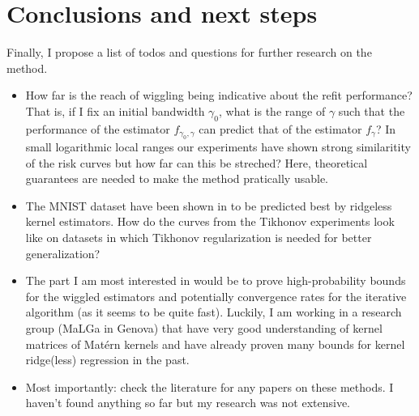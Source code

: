 \documentclass[12pt]{amsart}
\begin{document}
%

\section{Conclusions and next steps}

Finally, I propose a list of todos and questions for further research on 
the method.
\begin{itemize}
    \item How far is the reach of wiggling being indicative about the refit
        performance? That is, if I fix an initial bandwidth $\gamma_0$, 
        what is the range of $\gamma$ such that the performance of the 
        estimator $f_{\gamma_0, \gamma}$ can predict that of the estimator
        $f_\gamma$? In small logarithmic local ranges our experiments have
        shown strong similaritity of the risk curves but how far can this be 
        streched? Here, theoretical guarantees are needed to make the method
        pratically usable.
    \item The MNIST dataset have been shown in \cite{justinterpolate} to 
        be predicted best by ridgeless kernel estimators.
        How do the curves from the Tikhonov experiments look like on 
        datasets in which Tikhonov regularization is needed for better
        generalization?
    \item The part I am most interested in would be to prove high-probability
        bounds for the wiggled estimators and potentially convergence rates
        for the iterative algorithm (as it seems to be quite fast).
        Luckily, I am working in a research group (MaLGa in Genova) that 
        have very good understanding of kernel matrices of Matérn kernels
        and have already proven many bounds for kernel ridge(less) 
        regression in the past.
    \item Most importantly: check the literature for any papers on these
        methods. I haven't found anything so far but my research was not 
        extensive.
\end{itemize}
\end{document}
